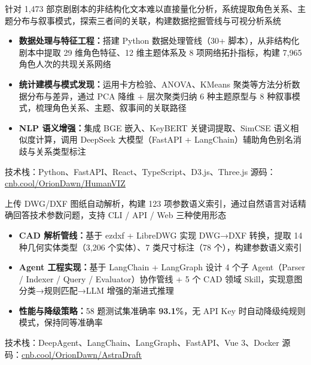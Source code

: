 \documentclass[UTF8,AutoFakeBold]{resume}
\begin{document}

\hspace*{1.5em}\kaishu 针对 1,473 部京剧剧本的非结构化文本难以直接量化分析，系统提取角色关系、主题分布与叙事模式，探索三者间的关联，构建数据挖掘管线与可视分析系统
\begin{itemize}
    \item[\faThumbTack] \kaishu \textbf{数据处理与特征工程：}搭建 Python 数据处理管线（30+ 脚本），从非结构化剧本中提取 29 维角色特征、12 维主题体系及 8 项网络拓扑指标，构建 7,965 角色人次的共现关系网络
    \item[\faThumbTack] \kaishu \textbf{统计建模与模式发现：}运用卡方检验、ANOVA、KMeans 聚类等方法分析数据分布与差异，通过 PCA 降维 + 层次聚类归纳 6 种主题原型与 8 种叙事模式，梳理角色关系、主题、叙事间的关联路径
    \item[\faThumbTack] \kaishu \textbf{NLP 语义增强：}集成 BGE 嵌入、KeyBERT 关键词提取、SimCSE 语义相似度计算，调用 DeepSeek 大模型（FastAPI + LangChain）辅助角色别名消歧与关系类型标注
\end{itemize}
\gapDetail
\noindent\kaishu 技术栈：Python、FastAPI、React、TypeScript、D3.js、Three.js \quad 源码：\href{https://cnb.cool/OrionDawn/HumanVIZ}{\underline{cnb.cool/OrionDawn/HumanVIZ}}

\gapProject

\hspace*{1.5em}\kaishu 上传 DWG/DXF 图纸自动解析，构建 123 项参数语义索引，通过自然语言对话精确回答技术参数问题，支持 CLI / API / Web 三种使用形态
\begin{itemize}
    \item[\faThumbTack] \kaishu \textbf{CAD 解析管线：}基于 ezdxf + LibreDWG 实现 DWG→DXF 转换，提取 14 种几何实体类型（3,206 个实体）、7 类尺寸标注（78 个），构建参数语义索引
    \item[\faThumbTack] \kaishu \textbf{Agent 工程实现：}基于 LangChain + LangGraph 设计 4 个子 Agent（Parser / Indexer / Query / Evaluator）协作管线 + 5 个 CAD 领域 Skill，实现意图分类→规则匹配→LLM 增强的渐进式推理
    \item[\faThumbTack] \kaishu \textbf{性能与降级策略：}58 题测试集准确率 \textbf{93.1\%}，无 API Key 时自动降级纯规则模式，保持同等准确率
\end{itemize}
\gapDetail
\noindent\kaishu 技术栈：DeepAgent、LangChain、LangGraph、FastAPI、Vue 3、Docker \quad 源码：\href{https://cnb.cool/OrionDawn/AstraDraft}{\underline{cnb.cool/OrionDawn/AstraDraft}}
\end{document}
